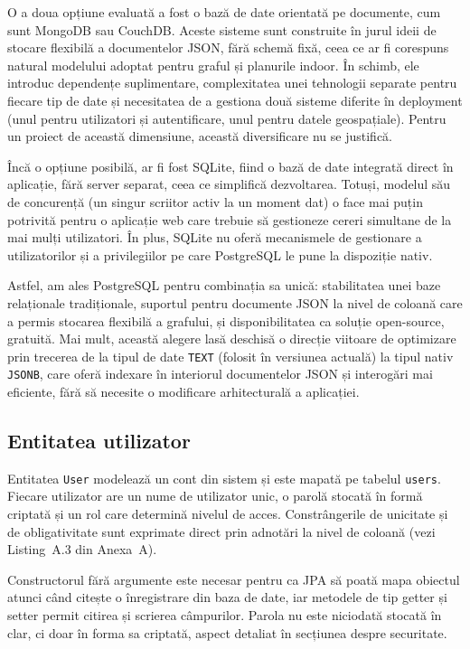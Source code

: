 O a doua opțiune evaluată a fost o bază de date orientată pe documente, cum
sunt MongoDB sau CouchDB. Aceste sisteme sunt construite în jurul ideii de
stocare flexibilă a documentelor JSON, fără schemă fixă, ceea ce ar fi
corespuns natural modelului adoptat pentru graful și planurile indoor. În
schimb, ele introduc dependențe suplimentare, complexitatea unei tehnologii
separate pentru fiecare tip de date și necesitatea de a gestiona două sisteme
diferite în deployment (unul pentru utilizatori și autentificare, unul pentru
datele geospațiale). Pentru un proiect de această dimensiune, această
diversificare nu se justifică.
 
Încă o opțiune posibilă, ar fi fost SQLite, fiind  o
bază de date integrată direct în aplicație, fără server separat, ceea ce
simplifică dezvoltarea. Totuși, modelul său de concurență (un singur
scriitor activ la un moment dat) o face mai puțin potrivită pentru o
aplicație web care trebuie să gestioneze cereri simultane de la mai mulți
utilizatori. În plus, SQLite nu oferă mecanismele de gestionare a
utilizatorilor și a privilegiilor pe care PostgreSQL le pune la dispoziție
nativ.
 
Astfel, am ales PostgreSQL pentru combinația sa unică: stabilitatea unei baze
relaționale tradiționale, suportul pentru documente JSON la nivel de coloană
care a permis stocarea flexibilă a grafului, și disponibilitatea ca soluție
open-source, gratuită. Mai mult, această alegere lasă deschisă o
direcție viitoare de optimizare prin trecerea de la tipul de date \texttt{TEXT}
(folosit în versiunea actuală) la tipul nativ \texttt{JSONB}, care oferă
indexare în interiorul documentelor JSON și interogări mai eficiente, fără
să necesite o modificare arhitecturală a aplicației.


\subsection{Entitatea utilizator}
\label{subsec:user-entity}

Entitatea \texttt{User} modelează un cont din sistem și este mapată pe tabelul
\texttt{users}. Fiecare utilizator are un
nume de utilizator unic, o parolă stocată în formă criptată și un rol care
determină nivelul de acces. Constrângerile de unicitate și de obligativitate
sunt exprimate direct prin adnotări la nivel de coloană (vezi Listing~A.3 din
Anexa~A).

Constructorul fără argumente este necesar pentru ca JPA să poată mapa
obiectul atunci când citește o înregistrare din baza de date, iar metodele de
tip getter și setter permit citirea și scrierea câmpurilor. Parola nu este
niciodată stocată în clar, ci doar în forma sa criptată, aspect detaliat în
secțiunea despre securitate.
\newpage
